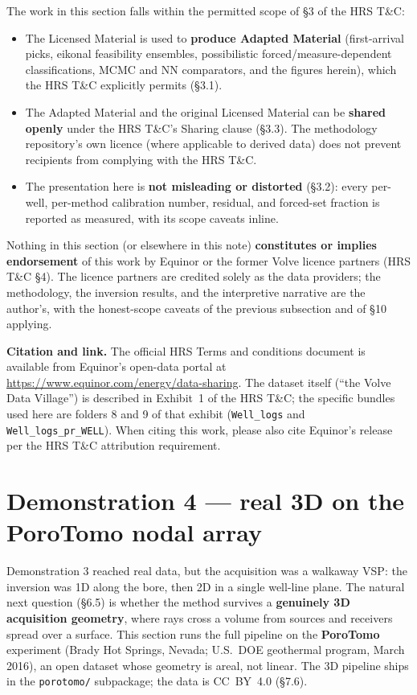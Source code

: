 \documentclass[11pt]{article}
\newcommand{\file}[1]{\texttt{#1}}
\begin{document}
The work in this section falls within the permitted scope of \S3 of the
HRS T\&C:
\begin{itemize}
\item The Licensed Material is used to \textbf{produce Adapted Material}
  (first-arrival picks, eikonal feasibility ensembles, possibilistic
  forced/measure-dependent classifications, MCMC and NN comparators, and
  the figures herein), which the HRS T\&C explicitly permits (\S3.1).
\item The Adapted Material and the original Licensed Material can be
  \textbf{shared openly} under the HRS T\&C's Sharing clause (\S3.3). The
  methodology repository's own licence (where applicable to derived data)
  does not prevent recipients from complying with the HRS T\&C.
\item The presentation here is \textbf{not misleading or distorted}
  (\S3.2): every per-well, per-method calibration number, residual, and
  forced-set fraction is reported as measured, with its scope caveats
  inline.
\end{itemize}

Nothing in this section (or elsewhere in this note) \textbf{constitutes or
implies endorsement} of this work by Equinor or the former Volve licence
partners (HRS T\&C \S4). The licence partners are credited solely as the
data providers; the methodology, the inversion results, and the
interpretive narrative are the author's, with the honest-scope caveats of
the previous subsection and of \S10 applying.

\textbf{Citation and link.} The official HRS Terms and conditions document
is available from Equinor's open-data portal at
\url{https://www.equinor.com/energy/data-sharing}. The dataset itself
(``the Volve Data Village'') is described in Exhibit~1 of the HRS T\&C;
the specific bundles used here are folders 8 and 9 of that exhibit
(\file{Well\_logs} and \file{Well\_logs\_pr\_WELL}). When citing this
work, please also cite Equinor's release per the HRS T\&C attribution
requirement.

\section{Demonstration 4 --- real 3D on the PoroTomo nodal array}
\label{sec:porotomo}

Demonstration 3 reached real data, but the acquisition was a walkaway VSP:
the inversion was 1D along the bore, then 2D in a single well-line plane.
The natural next question (\S6.5) is whether the method survives a
\textbf{genuinely 3D acquisition geometry}, where rays cross a volume from
sources and receivers spread over a surface. This section runs the full
pipeline on the \textbf{PoroTomo} experiment (Brady Hot Springs, Nevada;
U.S.\ DOE geothermal program, March 2016), an open dataset whose geometry
is areal, not linear. The 3D pipeline ships in the \file{porotomo/}
subpackage; the data is CC~BY~4.0 (\S7.6).
\end{document}
